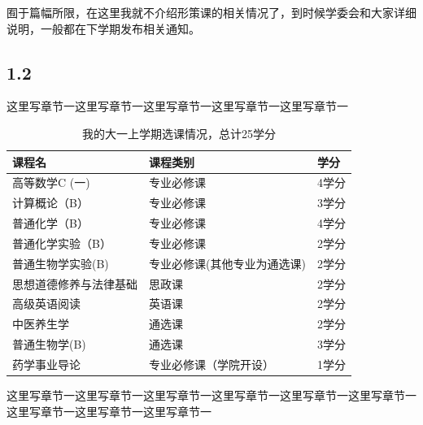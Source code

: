 \documentclass[UTF8,12pt,a4paper]{ctexart}
\begin{document}
囿于篇幅所限，在这里我就不介绍形策课的相关情况了，到时候学委会和大家详细说明，一般都在下学期发布相关通知。
\subsection{1.2}

这里写章节一这里写章节一这里写章节一这里写章节一这里写章节一
\begin{table}[h]
	\renewcommand\arraystretch{1.2}
	\centering
	\begin{tabular}{@{}lll@{}}
		\toprule
		\textbf{课程名}        & \textbf{课程类别}                & \textbf{学分} \\ \midrule
		高等数学C (一)         & 专业必修课                       & 4学分         \\
		计算概论（B）          & 专业必修课                       & 3学分         \\
		普通化学（B）          & 专业必修课                       & 4学分         \\
		普通化学实验（B）      & 专业必修课                       & 2学分         \\
		普通生物学实验(B)      & 专业必修课(其他专业为通选课) & 2学分         \\
		思想道德修养与法律基础 & 思政课                           & 2学分         \\
		高级英语阅读           & 英语课                           & 2学分         \\
		中医养生学             & 通选课                           & 2学分         \\
		普通生物学(B)          & 通选课                           & 3学分         \\
		药学事业导论           & 专业必修课（学院开设）           & 1学分         \\ \bottomrule
	\end{tabular}
	\caption{我的大一上学期选课情况，总计25学分}
	\label{tab:my-table}
\end{table}

这里写章节一这里写章节一这里写章节一这里写章节一这里写章节一这里写章节一这里写章节一这里写章节一这里写章节一
\end{document}
